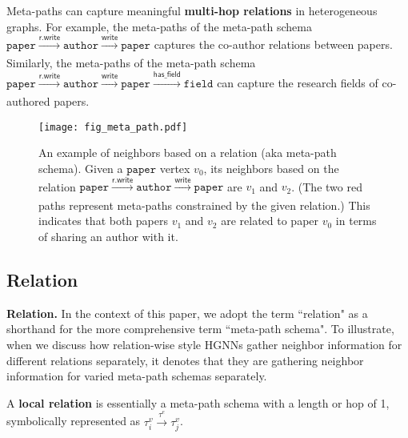 \documentclass[lettersize,journal]{IEEEtran}
\begin{document}
Meta-paths can capture meaningful \textbf{multi-hop relations} in heterogeneous graphs.
For example, the meta-paths of the meta-path schema $\mathtt{paper} \xrightarrow[]{\mathsf{r.write}} \mathtt{author} \xrightarrow[]{\mathsf{write}} \mathtt{paper}$ captures the co-author relations between papers.
Similarly, the meta-paths of the meta-path schema $\mathtt{paper} \xrightarrow[]{\mathsf{r.write}} \mathtt{author} \xrightarrow[]{\mathsf{write}} \mathtt{paper} \xrightarrow[]{\mathsf{has\_field}} \mathtt{field}$ can capture the research fields of co-authored papers.




\begin{figure}[!tp]
\centering\texttt{[image: fig\_meta\_path.pdf]}
\vspace{-3mm}
\caption{
An example of neighbors based on a relation (aka meta-path schema).
Given a $\mathtt{paper}$ vertex $v_0$, its neighbors based on the relation $\mathtt{paper} \xrightarrow[]{\mathsf{r.write}} \mathtt{author} \xrightarrow[]{\mathsf{write}} \mathtt{paper}$ are $v_1$ and $v_2$.
(The two red paths represent meta-paths constrained by the given relation.)
This indicates that both papers $v_1$ and $v_2$ are related to paper $v_0$ in terms of sharing an author with it.
}
 \label{fig:meta_path}
 \vspace{-4mm}
\end{figure}



\subsection{Relation}


\textbf{Relation.}
In the context of this paper, we adopt the term ``relation" as a shorthand for the more comprehensive term ``meta-path schema". 
To illustrate, when we discuss how relation-wise style HGNNs gather neighbor information for different relations separately, it denotes that they are gathering neighbor information for varied meta-path schemas separately.

A \textbf{local relation} is essentially a meta-path schema with a length or hop of 1, symbolically represented as $\tau^{v}_{i} \xrightarrow[]{\tau^{e}} \tau^{v}_{j}$.
\end{document}
